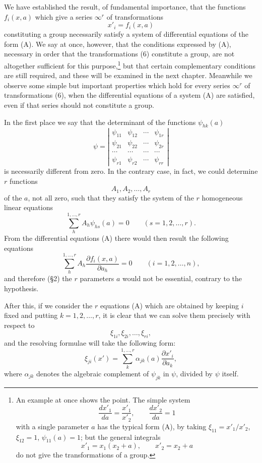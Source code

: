 \documentclass[11pt]{book}
\begin{document}
We have established the result, of fundamental importance, that the functions $f_i(x,a)$ which give a series $\infty^r$ of transformations
\begin{equation*}\tag{6}
 x'_i=f_i(x,a)
\end{equation*}
constituting a group necessarily satisfy a system of differential equations of the form (A). We say at once, however, that the conditions expressed by (A), necessary in order that the transformations (6) constitute a group, are not altogether sufficient for this purpose,\footnote{An example at once shows the point. The simple system
\[
 \frac{dx'_1}{da}=\frac{x'_1}{x'_2},\qquad \frac{dx'_2}{da}=1
\]
with a single parameter $a$ has the typical form (A), by taking $\xi_{11}=x'_1/x'_2$, $\xi_{12}=1$, $\psi_{11}(a)=1$; but the general integrals
\[
 x'_1=x_1(x_2+a),\qquad x'_2=x_2+a
\]
do not give the transformations of a group.} but that certain complementary conditions are still required, and these will be examined in the next chapter. Meanwhile we observe some simple but important properties which hold for every series $\infty^r$ of transformations (6), when the differential equations of a system (A) are satisfied, even if that series should not constitute a group.

In the first place we say that the determinant of the functions $\psi_{hk}(a)$
\[
 \psi=\left|\begin{array}{cccc}
 \psi_{11}&\psi_{12}&\cdots&\psi_{1r}\\
 \psi_{21}&\psi_{22}&\cdots&\psi_{2r}\\
 \cdots&\cdots&\cdots&\cdots\\
 \psi_{r1}&\psi_{r2}&\cdots&\psi_{rr}
 \end{array}\right|
\]
is necessarily different from zero. In the contrary case, in fact, we could determine $r$ functions
\[
 A_1,A_2,\ldots,A_r
\]
of the $a$, not all zero, such that they satisfy the system of the $r$ homogeneous linear equations
\[
 \sum\limits_h^{1,\ldots,r} A_h\psi_{hs}(a)=0\qquad (s=1,2,\ldots,r).
\]
From the differential equations (A) there would then result the following equations
\[
 \sum\limits_h^{1,\ldots,r} A_h\frac{\partial f_i(x,a)}{\partial a_h}=0\qquad (i=1,2,\ldots,n),
\]
and therefore (\S{}2) the $r$ parameters $a$ would not be essential, contrary to the hypothesis.

After this, if we consider the $r$ equations (A) which are obtained by keeping $i$ fixed and putting $k=1,2,\ldots,r$, it is clear that we can solve them precisely with respect to
\[
 \xi_{1i},\xi_{2i},\ldots,\xi_{ri},
\]
and the resolving formulae will take the following form:
\begin{equation*}\tag{B}
 \xi_{ji}(x')=\sum\limits_k^{1,\ldots,r}\alpha_{jk}(a)\frac{\partial x'_i}{\partial a_k},
\end{equation*}
where $\alpha_{jk}$ denotes the algebraic complement of $\psi_{jk}$ in $\psi$, divided by $\psi$ itself.
\end{document}
